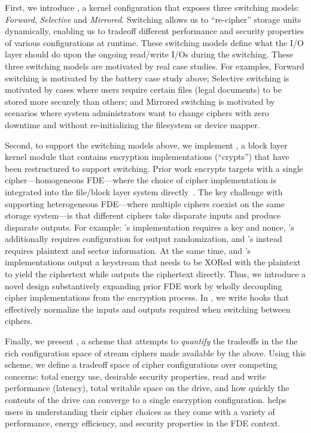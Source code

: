 First, we introduce \sysA, a kernel configuration that exposes three switching
models: {\em Forward}, {\em Selective} and {\em Mirrored}. Switching allows us
to ``re-cipher'' storage units dynamically, enabling us to tradeoff different
performance and security properties of various configurations at runtime. These
switching models define what the I/O layer should do upon the ongoing read/write
I/Os during the switching. These three switching models are motivated by real
case studies. For examples, Forward switching is motivated by the battery case
study above; Selective switching is motivated by cases where users require
certain files (\eg legal documents) to be stored more securely than others; and
Mirrored switching is motivated by scenarios where system administrators want to
change ciphers with zero downtime and without re-initializing the filesystem or
device mapper.

Second, to support the switching models above, we implement \sysB, a block layer
kernel module that contains encryption implementations (``crypts'') that have
been restructured to support switching. Prior work encrypts targets with a
single cipher---\ie homogeneous FDE---where the choice of cipher implementation
is integrated into the file/block layer system directly~\cite{StrongBox,
dmcrypt}. The key challenge with supporting heterogeneous FDE---where multiple
ciphers coexist on the same storage system---is that different ciphers take
disparate inputs and produce disparate outputs. For example: \encB's
implementation requires a key and nonce, \encA's additionally requires
configuration for output randomization, and \encC's instead requires plaintext
and sector information. At the same time, \encA and \encB's implementations
output a keystream that needs to be XORed with the plaintext to yield the
ciphertext while \encC outputs the ciphertext directly. Thus, we introduce a
novel design substantively expanding prior FDE work by wholly decoupling cipher
implementations from the encryption process. In \sysB, we write hooks that
effectively normalize the inputs and outputs required when switching between
ciphers.

Finally, we present \sysC, a scheme that attempts to {\em quantify} the
tradeoffs in the the rich configuration space of stream ciphers made available
by the above. Using this scheme, we define a tradeoff space of cipher
configurations over competing concerns: total energy use, desirable security
properties, read and write performance (latency), total writable space on the
drive, and how quickly the contents of the drive can converge to a single
encryption configuration. \sysC helps users in understanding their cipher
choices as they come with a variety of performance, energy efficiency, and
security properties in the FDE context.


